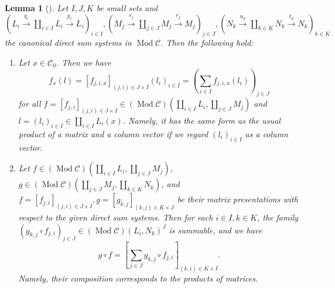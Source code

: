 \documentclass{surv-l}
\numberwithin{equation}{chapter}
\numberwithin{figure}{chapter}
\theoremstyle{plain}
\newtheorem{lem}[thm]{Lemma}
\theoremstyle{definition}
\theoremstyle{remark}
\DeclareMathOperator{\Mod}{Mod}
\begin{document}
\begin{lem}[]\label{lem:matrix-presentation}
Let $I, J, K$ be small sets and
$(L_i \xrightarrow{q_i} \coprod_{i\in I}L_i \xrightarrow{p_i} L_i)_{i \in I},
(M_j \xrightarrow{s_j} \coprod_{j\in J}M_j \xrightarrow{r_j} M_j)_{j \in J},
(N_k \xrightarrow{u_k}  \coprod_{k\in K}N_k \xrightarrow{t_k} N_k)_{k \in K}$
the canonical direct sum systems in $\Mod{\mathcal{C}}$.
Then the following hold:
\begin{enumerate}
\item
Let $x \in {\mathcal{C}}_0$.
Then we have
\[
f_x(l) = [f_{j,i,x}]_{(j,i)\in J\times I}(l_i)_{i\in I} = \left(\sum_{i\in I}f_{j,i,x}(l_i)\right)_{j\in J}
\]
for all $f = [f_{j,i}]_{(j,i) \in J\times I}\in (\Mod{\mathcal{C}})(\coprod_{i\in I}L_i, \coprod_{j\in J}M_j)$
and $l=(l_i)_{i\in I} \in \coprod_{i\in I}L_i(x)$.
Namely, it has the same form as the usual product of a matrix and a column vector
if we regard $(l_i)_{i\in I}$ as a column vector.
\item
Let $f\in (\Mod{\mathcal{C}})(\coprod_{i\in I}L_i, \coprod_{j\in J}M_j)$,
$g \in (\Mod{\mathcal{C}})(\coprod_{j\in J}M_j, \coprod_{k\in K}N_k)$, and
$f = [f_{j,i}]_{(j,i)\in J\times I}, g = [g_{k,j}]_{(k,j)\in K\times J}$
be their matrix presentations with respect to the given direct sum systems.
Then
for each $i \in I, k \in K$,
the family $(g_{k,j}\circ f_{j,i})_{j\in J} \in (\Mod{\mathcal{C}})(L_i, N_k)^J$
is summable, and we have
\[
g \circ f = \left[\sum_{j \in J} g_{k,j}\circ f_{j,i}\right]_{(k,i)\in K\times I}.
\]
Namely, their composition corresponds to the products of matrices.
\end{enumerate}
\end{lem}
\end{document}
